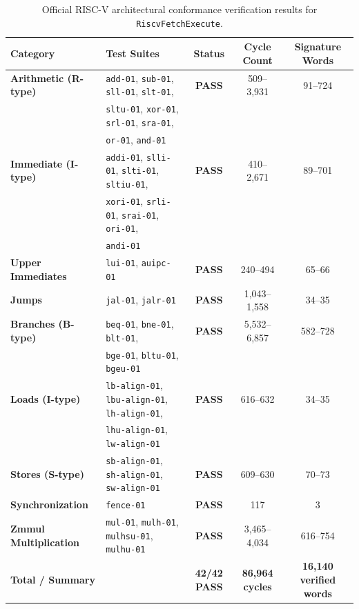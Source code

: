 \begin{table}[htbp]
\centering
\small
\begin{tabular}{|l|l|c|c|c|}
\hline
\textbf{Category} & \textbf{Test Suites} & \textbf{Status} & \textbf{Cycle Count} & \textbf{Signature Words} \\
\hline
\textbf{Arithmetic (R-type)} & \texttt{add-01}, \texttt{sub-01}, \texttt{sll-01}, \texttt{slt-01}, & \textbf{PASS} & 509--3,931 & 91--724 \\
                             & \texttt{sltu-01}, \texttt{xor-01}, \texttt{srl-01}, \texttt{sra-01}, & & & \\
                             & \texttt{or-01}, \texttt{and-01} & & & \\
\hline
\textbf{Immediate (I-type)}  & \texttt{addi-01}, \texttt{slli-01}, \texttt{slti-01}, \texttt{sltiu-01}, & \textbf{PASS} & 410--2,671 & 89--701 \\
                             & \texttt{xori-01}, \texttt{srli-01}, \texttt{srai-01}, \texttt{ori-01}, & & & \\
                             & \texttt{andi-01} & & & \\
\hline
\textbf{Upper Immediates}     & \texttt{lui-01}, \texttt{auipc-01} & \textbf{PASS} & 240--494 & 65--66 \\
\hline
\textbf{Jumps}               & \texttt{jal-01}, \texttt{jalr-01} & \textbf{PASS} & 1,043--1,558 & 34--35 \\
\hline
\textbf{Branches (B-type)}   & \texttt{beq-01}, \texttt{bne-01}, \texttt{blt-01}, & \textbf{PASS} & 5,532--6,857 & 582--728 \\
                             & \texttt{bge-01}, \texttt{bltu-01}, \texttt{bgeu-01} & & & \\
\hline
\textbf{Loads (I-type)}      & \texttt{lb-align-01}, \texttt{lbu-align-01}, \texttt{lh-align-01}, & \textbf{PASS} & 616--632 & 34--35 \\
                             & \texttt{lhu-align-01}, \texttt{lw-align-01} & & & \\
\hline
\textbf{Stores (S-type)}     & \texttt{sb-align-01}, \texttt{sh-align-01}, \texttt{sw-align-01} & \textbf{PASS} & 609--630 & 70--73 \\
\hline
\textbf{Synchronization}     & \texttt{fence-01} & \textbf{PASS} & 117 & 3 \\
\hline
\textbf{Zmmul Multiplication}& \texttt{mul-01}, \texttt{mulh-01}, \texttt{mulhsu-01}, \texttt{mulhu-01} & \textbf{PASS} & 3,465--4,034 & 616--754 \\
\hline
\multicolumn{2}{|l|}{\textbf{Total / Summary}} & \textbf{42/42 PASS} & \textbf{86,964 cycles} & \textbf{16,140 verified words} \\
\hline
\end{tabular}
\caption{Official RISC-V architectural conformance verification results for \texttt{RiscvFetchExecute}.}\label{tab:conformance_results}
\end{table}

